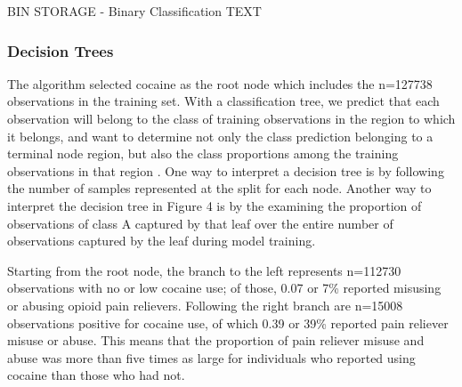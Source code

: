 BIN STORAGE - Binary Classification TEXT





\subsubsection{Decision Trees} 

The algorithm selected cocaine as the root node which includes the n=127738 
observations in the training set. With a classification tree, we predict 
that each observation will belong to the class of training observations in 
the region to which it belongs, and want to determine not only the class
prediction belonging to a terminal node region, but also the class 
proportions among the training observations in that region \cite{james13}. 
One way to interpret a decision tree is by following the number of samples 
represented at the split for each node. Another way to interpret the decision 
tree in Figure 4 is by the examining the proportion of observations of 
class A captured by that leaf over the entire number of observations captured 
by the leaf during model training. 

Starting from the root node, the branch 
to the left represents n=112730 observations with no or low cocaine use; 
of those, 0.07 or 7\% reported misusing or abusing opioid pain relievers. 
Following the right branch are n=15008 observations positive for cocaine use, 
of which 0.39 or 39\% reported pain reliever misuse or abuse. This means that 
the proportion of pain reliever misuse and abuse was more than five times as 
large for individuals who reported using cocaine than those who had not. 


